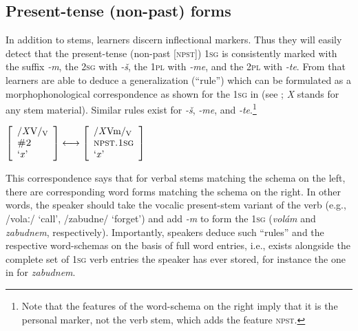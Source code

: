 \documentclass[output=paper,colorlinks,citecolor=brown]{langscibook}
\begin{document}

\subsection{Present-tense (non-past) forms}\label{sec:PresentTense}


In addition to stems, learners discern inflectional markers. Thus they will easily detect that the present-tense (non-past [\textsc{npst}]) \textsc{1sg} is consistently marked with the suffix \textit{-m}, the \textsc{2sg} with \textit{-š}, the \textsc{1pl} with \textit{-me}, and the \textsc{2pl} with \textit{-te}. From that learners are able to deduce a generalization (``rule'') which can be formulated as a morphophonological correspondence as shown for the \textsc{1sg} in  (see \citealt[47--48]{HaspelmathSims2010}; \textit{X} stands for any stem material). Similar rules exist for \textit{-š}, \textit{-me}, and \textit{-te}.\footnote{Note that the features of the word-schema on the right imply that it is the personal marker, not the verb stem, which adds the feature \textsc{npst}.}




\ea\label{ex:rule1SG}
$\left[
\begin{array}{l}
    \text{/\textit{X}V/\textsubscript{V}} \\
    \textsc{\#2} \\
    \text{`\textit{x}'}
\end{array}
\right]  
\longleftrightarrow
\left[
\begin{array}{l}
    \text{/\textit{X}Vm/\textsubscript{V}} \\
    \textsc{npst.1sg} \\
    \text{`\textit{x}'}
\end{array}
\right] $
\z

\noindent This correspondence says that for verbal stems matching the schema on the left, there are corresponding word forms matching the schema on the right. In other words, the speaker should take the vocalic present-stem variant of the verb (e.g., /volaː/ `call', /zabudne/ `forget') and add \textit{-m} to form the \textsc{1sg} (\textit{volám} and \textit{zabudnem}, respectively). Importantly, speakers deduce such ``rules'' and the respective word-schemas on the basis of full word entries, i.e.,  exists alongside the complete set of \textsc{1sg} verb entries the speaker has ever stored, for instance the one in  for \textit{zabudnem}.
\end{document}
